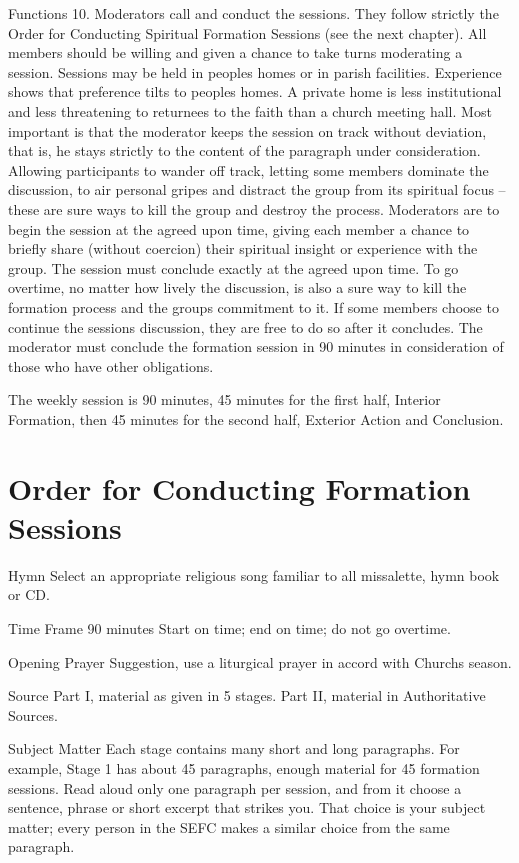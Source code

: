 \documentclass[oneside]{book}
\begin{document}
Functions 10. Moderators call and conduct the sessions. They follow strictly the
Order for Conducting Spiritual Formation Sessions (see the next chapter). All
members should be willing and given a chance to take turns moderating a
session. Sessions may be held in peoples homes or in parish
facilities. Experience shows that preference tilts to peoples homes. A private
home is less institutional and less threatening to returnees to the faith than a
church meeting hall.  Most important is that the moderator keeps the session on
track without deviation, that is, he stays strictly to the content of the
paragraph under consideration. Allowing participants to wander off track,
letting some members dominate the discussion, to air personal gripes and
distract the group from its spiritual focus -- these are sure ways to kill the
group and destroy the process.  Moderators are to begin the session at the
agreed upon time, giving each member a chance to briefly share (without
coercion) their spiritual insight or experience with the group. The session must
conclude exactly at the agreed upon time. To go overtime, no matter how lively
the discussion, is also a sure way to kill the formation process and the groups
commitment to it.  If some members choose to continue the sessions discussion,
they are free to do so after it concludes. The moderator must conclude the
formation session in 90 minutes in consideration of those who have other
obligations.

The weekly session is 90 minutes, 45 minutes for the first half, Interior
Formation, then 45 minutes for the second half, Exterior Action and Conclusion.


\chapter{Order for Conducting Formation Sessions}

Hymn Select an appropriate religious song familiar to all missalette, hymn book
or CD.

Time Frame 90 minutes Start on time; end on time; do not go overtime.

Opening Prayer Suggestion, use a liturgical prayer in accord with Churchs
season.

Source Part I, material as given in 5 stages.  Part II, material in
Authoritative Sources.

Subject Matter Each stage contains many short and long paragraphs. For example,
Stage 1 has about 45 paragraphs, enough material for 45 formation sessions. Read
aloud only one paragraph per session, and from it choose a sentence, phrase or
short excerpt that strikes you. That choice is your subject matter; every person
in the SEFC makes a similar choice from the same paragraph.
\end{document}
